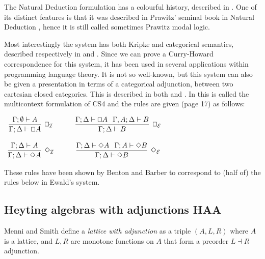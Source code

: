\documentclass{article}
\renewcommand{\Box}{\oblong}
\begin{document}
The Natural Deduction formulation has a  colourful history, described in \cite{CS4}. One of its distinct features is that it was described in Prawitz' seminal book in Natural Deduction \cite{prawitz1965}, hence it is still called sometimes Prawitz modal logic.

Most interestingly the system has both Kripke and categorical semantics, described  respectively in \cite{alechinaetal} and \cite{CS4}. Since we can prove a Curry-Howard correspondence for this system, it has been used in several applications within programming language theory. 
It is not so well-known, but this system can also be given a presentation in terms of a categorical adjunction, between two cartesian closed categories. This is described in both \cite{CS4} and \cite{icalp1998}. In \cite{CS4} this is called the multicontext formulation of CS4 and the rules are given (page 17) as follows:

\begin{center}
  \begin{math}
    \begin{array}{ccccc}              
      \infer[\Box_{\mathcal{I}}]{\Gamma; \Delta \vdash \Box A}{
        \Gamma;\emptyset \vdash  A
      }
      & \quad &
      \infer[\Box_{\mathcal{E}}]{\Gamma;\Delta \vdash B}{\Gamma; \Delta \vdash \Box A \hspace{.1in}
        \Gamma, A;\Delta \vdash B
      }\\\\
      \infer[\Diamond_{\mathcal{I}}]{\Gamma;\Delta \vdash \Diamond A}{
        \Gamma;\Delta \vdash A
      }
      & \quad &
      \infer[\Diamond_{\mathcal{E}}]{\Gamma;\Delta \vdash \Diamond B}{
        \Gamma ;\Delta \vdash \Diamond A \hspace{.1in}\Gamma; A\vdash \Diamond B
      }
    \end{array}        
  \end{math}
\end{center}

These rules have been shown by Benton\cite{benton1995} and Barber to correspond to (half of) the rules below in Ewald's system.

\subsection{Heyting algebras with adjunctions HAA}
Menni and Smith \cite{Menni:2014} define a \textit{lattice with adjunction} as a triple $(A, L, R)$ where $A$ is a lattice, and $L, R$   are  monotone functions on $A$ that form a preorder $L\dashv R$ adjunction.
\end{document}
